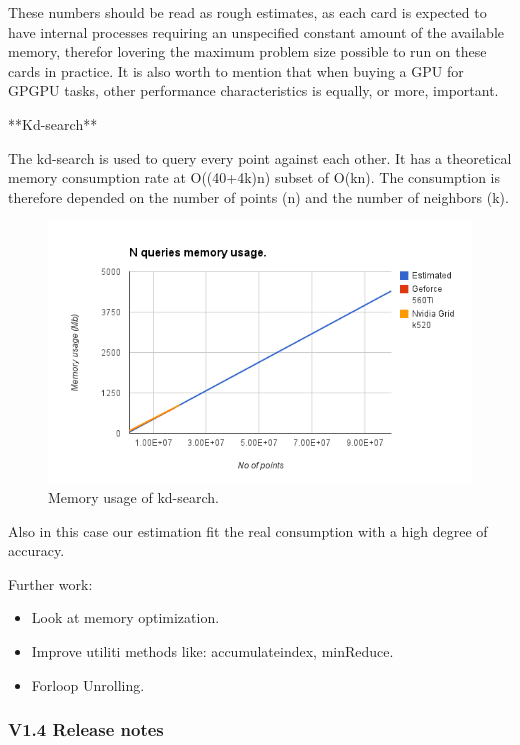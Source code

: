 These numbers should be read as rough estimates, as each card is expected to have internal processes requiring an unspecified constant amount of the available memory, therefor lovering the maximum problem size possible to run on these cards in practice. It is also worth to mention that when buying a GPU for GPGPU tasks, other performance characteristics is equally, or more, important.

**Kd-search**

The kd-search is used to query every point against each other. It has a theoretical memory consumption rate at O((40+4k)n) subset of O(kn). The consumption is therefore depended on the number of points (n) and the number of neighbors (k).

\begin{figure}[ht!]
\centering
\includegraphics[width=120mm]{../gfx/memory-usage-kd-search.png}

\caption{Memory usage of kd-search.}
\label{fig:memory-usage-kd-search}
\end{figure}

Also in this case our estimation fit the real consumption with a high degree of accuracy.

Further work:
\begin{itemize}
    \item Look at memory optimization.
    \item Improve utiliti methods like: accumulateindex, minReduce.
    \item Forloop Unrolling.
\end{itemize}


\subsubsection{V1.4 Release notes} %
\label{ssub:v14_release_notes}

